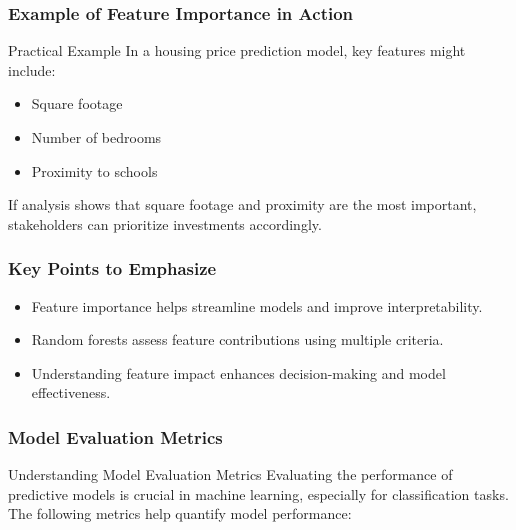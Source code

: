 \documentclass[aspectratio=169]{beamer}
\begin{document}
\begin{frame}[fragile]
    \frametitle{Example of Feature Importance in Action}
    \begin{block}{Practical Example}
        In a housing price prediction model, key features might include:
    \end{block}
    \begin{itemize}
        \item Square footage
        \item Number of bedrooms
        \item Proximity to schools
    \end{itemize}
    If analysis shows that square footage and proximity are the most important, stakeholders can prioritize investments accordingly.
\end{frame}

\begin{frame}[fragile]
    \frametitle{Key Points to Emphasize}
    \begin{itemize}
        \item Feature importance helps streamline models and improve interpretability.
        \item Random forests assess feature contributions using multiple criteria.
        \item Understanding feature impact enhances decision-making and model effectiveness.
    \end{itemize}
\end{frame}

\begin{frame}[fragile]
    \frametitle{Model Evaluation Metrics}
    \begin{block}{Understanding Model Evaluation Metrics}
        Evaluating the performance of predictive models is crucial in machine learning, especially for classification tasks. The following metrics help quantify model performance:
    \end{block}
\end{frame}
\end{document}

